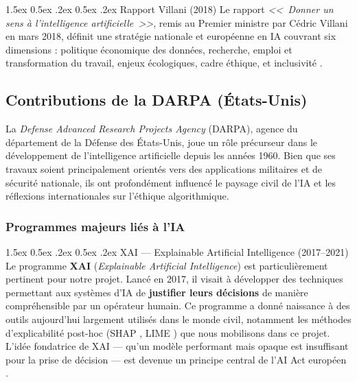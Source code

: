 \documentclass[12pt,a4paper]{article}
\makeatletter
\renewcommand\paragraph{\@startsection{paragraph}{4}{\z@}%
  {1.5ex \@plus 0.5ex \@minus .2ex}%
  {0.5ex \@plus .2ex}%
  {\normalfont\normalsize\bfseries}}
\makeatother
\begin{document}
\paragraph{Rapport Villani (2018)}
Le rapport \textit{<<~Donner un sens à l'intelligence artificielle~>>}, remis au Premier ministre par Cédric Villani en mars 2018, définit une stratégie nationale et européenne en IA couvrant six dimensions : politique économique des données, recherche, emploi et transformation du travail, enjeux écologiques, cadre éthique, et inclusivité \cite{villani}.

\subsection{Contributions de la DARPA (États-Unis)}

La \textit{Defense Advanced Research Projects Agency} (DARPA), agence du département de la Défense des États-Unis, joue un rôle précurseur dans le développement de l'intelligence artificielle depuis les années 1960. Bien que ses travaux soient principalement orientés vers des applications militaires et de sécurité nationale, ils ont profondément influencé le paysage civil de l'IA et les réflexions internationales sur l'éthique algorithmique.

\subsubsection{Programmes majeurs liés à l'IA}

\paragraph{XAI --- Explainable Artificial Intelligence (2017--2021)}
Le programme \textbf{XAI} (\textit{Explainable Artificial Intelligence}) est particulièrement pertinent pour notre projet. Lancé en 2017, il visait à développer des techniques permettant aux systèmes d'IA de \textbf{justifier leurs décisions} de manière compréhensible par un opérateur humain. Ce programme a donné naissance à des outils aujourd'hui largement utilisés dans le monde civil, notamment les méthodes d'explicabilité post-hoc (SHAP \cite{lundberg_shap}, LIME \cite{ribeiro_lime}) que nous mobilisons dans ce projet. L'idée fondatrice de XAI --- qu'un modèle performant mais opaque est insuffisant pour la prise de décision --- est devenue un principe central de l'AI Act européen \cite{darpa_xai}.
\end{document}
